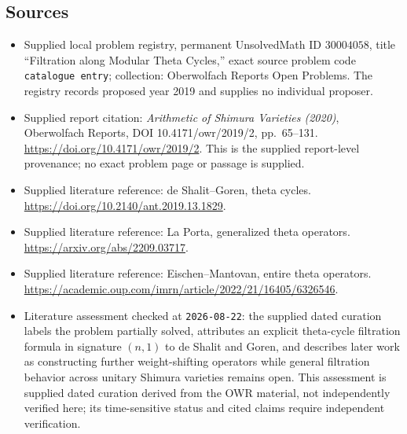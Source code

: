 \documentclass[11pt]{article}
\begin{document}
\subsection{Sources}
\begin{itemize}
\item Supplied local problem registry, permanent UnsolvedMath ID \(30004058\), title ``Filtration along Modular Theta Cycles,'' exact source problem code \texttt{catalogue entry}; collection: Oberwolfach Reports Open Problems. The registry records proposed year 2019 and supplies no individual proposer.
\item Supplied report citation: \emph{Arithmetic of Shimura Varieties (2020)}, Oberwolfach Reports, DOI 10.4171/owr/2019/2, pp.\ 65--131. \url{https://doi.org/10.4171/owr/2019/2}. This is the supplied report-level provenance; no exact problem page or passage is supplied.
\item Supplied literature reference: de Shalit--Goren, theta cycles. \url{https://doi.org/10.2140/ant.2019.13.1829}.
\item Supplied literature reference: La Porta, generalized theta operators. \url{https://arxiv.org/abs/2209.03717}.
\item Supplied literature reference: Eischen--Mantovan, entire theta operators. \url{https://academic.oup.com/imrn/article/2022/21/16405/6326546}.
\item Literature assessment checked at \texttt{2026-08-22}: the supplied dated curation labels the problem partially solved, attributes an explicit theta-cycle filtration formula in signature \((n,1)\) to de Shalit and Goren, and describes later work as constructing further weight-shifting operators while general filtration behavior across unitary Shimura varieties remains open. This assessment is supplied dated curation derived from the OWR material, not independently verified here; its time-sensitive status and cited claims require independent verification.
\end{itemize}
\end{document}
